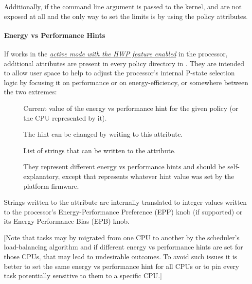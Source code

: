 \documentclass[a4paper,8pt,english]{sphinxmanual}
\begin{document}
Additionally, if the  command line argument
is passed to the kernel,  and  are not exposed
at all and the only way to set the limits is by using the policy attributes.


\paragraph{Energy vs Performance Hints}
\label{admin-guide/pm/intel_pstate:energy-vs-performance-hints}
If  works in the {\hyperref[admin\string-guide/pm/intel_pstate:active\string-mode\string-with\string-hwp]{\emph{active mode with the HWP feature enabled}}}\label{admin-guide/pm/intel_pstate:active-mode-with-hwp} in the processor, additional attributes are present
in every  policy directory in .  They are intended to allow
user space to help  to adjust the processor's internal P-state
selection logic by focusing it on performance or on energy-efficiency, or
somewhere between the two extremes:
\begin{description}
\item[{}] \leavevmode
Current value of the energy vs performance hint for the given policy
(or the CPU represented by it).

The hint can be changed by writing to this attribute.

\item[{}] \leavevmode
List of strings that can be written to the
 attribute.

They represent different energy vs performance hints and should be
self-explanatory, except that  represents whatever hint
value was set by the platform firmware.

\end{description}

Strings written to the  attribute are
internally translated to integer values written to the processor's
Energy-Performance Preference (EPP) knob (if supported) or its
Energy-Performance Bias (EPB) knob.

{[}Note that tasks may by migrated from one CPU to another by the scheduler's
load-balancing algorithm and if different energy vs performance hints are
set for those CPUs, that may lead to undesirable outcomes.  To avoid such
issues it is better to set the same energy vs performance hint for all CPUs
or to pin every task potentially sensitive to them to a specific CPU.{]}
\end{document}

